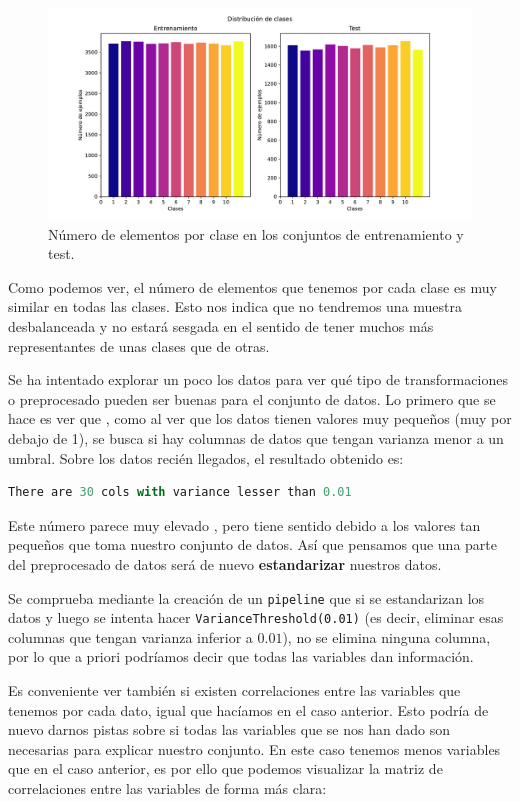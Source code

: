 \documentclass[a4paper, 20pt]{article}
\begin{document}
\begin{figure}[H]
  \centering
  \includegraphics[scale=0.4]{media/class_distr.pdf}
  \caption{Número de elementos por clase en los conjuntos de entrenamiento y test. }
  \label{fig:class-numbers}
\end{figure}

Como podemos ver, el número de elementos que tenemos por cada clase es muy similar en todas las clases. Esto nos indica que no tendremos una muestra desbalanceada y no estará sesgada en el sentido de tener muchos más representantes de unas clases que de otras.



Se ha intentado explorar un poco los datos para ver qué tipo de transformaciones o preprocesado pueden ser buenas para el conjunto de datos. Lo primero que se hace es ver que , como al ver que los datos tienen valores muy pequeños (muy por debajo de 1), se busca si hay columnas de datos que tengan varianza menor a un umbral. Sobre los datos recién llegados, el resultado obtenido es:
\begin{lstlisting}[language=Python]
  There are 30 cols with variance lesser than 0.01
\end{lstlisting}
Este número parece muy elevado , pero tiene sentido debido a los valores tan pequeños que toma nuestro conjunto de datos. Así que pensamos que una parte del preprocesado de datos será de nuevo \textbf{estandarizar} nuestros datos.

Se comprueba mediante la creación de un \lstinline{pipeline} que si se estandarizan los datos y luego se intenta hacer \lstinline{VarianceThreshold(0.01)} (es decir, eliminar esas columnas que tengan varianza inferior a $0.01$), no se elimina ninguna columna, por lo que a priori podríamos decir que todas las variables dan información.

Es conveniente ver también si existen correlaciones entre las variables que tenemos por cada dato, igual que hacíamos en el caso anterior. Esto podría de nuevo darnos pistas sobre si todas las variables que se nos han dado son necesarias para explicar nuestro conjunto. En este caso tenemos menos variables que en el caso anterior, es por ello que podemos visualizar la matriz de correlaciones entre las variables de forma más clara:
\end{document}
